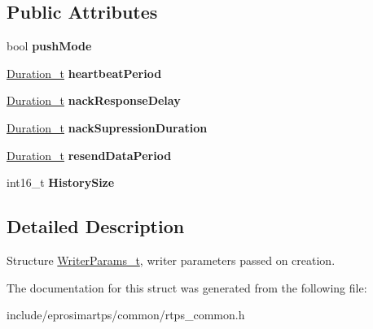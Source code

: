 \subsection*{\-Public \-Attributes}
\begin{DoxyCompactItemize}
\item 
\hypertarget{structeprosima_1_1rtps_1_1_writer_params__t_a9cdb3d394cca93c1173f714018e74c2d}{bool {\bfseries push\-Mode}}\label{structeprosima_1_1rtps_1_1_writer_params__t_a9cdb3d394cca93c1173f714018e74c2d}

\item 
\hypertarget{structeprosima_1_1rtps_1_1_writer_params__t_a00e3ebb4e40fc17294b495e2cdc68162}{\hyperlink{structeprosima_1_1rtps_1_1_time__t}{\-Duration\-\_\-t} {\bfseries heartbeat\-Period}}\label{structeprosima_1_1rtps_1_1_writer_params__t_a00e3ebb4e40fc17294b495e2cdc68162}

\item 
\hypertarget{structeprosima_1_1rtps_1_1_writer_params__t_ab50faaa0a67537459441c5bdf599dea0}{\hyperlink{structeprosima_1_1rtps_1_1_time__t}{\-Duration\-\_\-t} {\bfseries nack\-Response\-Delay}}\label{structeprosima_1_1rtps_1_1_writer_params__t_ab50faaa0a67537459441c5bdf599dea0}

\item 
\hypertarget{structeprosima_1_1rtps_1_1_writer_params__t_a57181178c6bc07de69d3d01cc625c47a}{\hyperlink{structeprosima_1_1rtps_1_1_time__t}{\-Duration\-\_\-t} {\bfseries nack\-Supression\-Duration}}\label{structeprosima_1_1rtps_1_1_writer_params__t_a57181178c6bc07de69d3d01cc625c47a}

\item 
\hypertarget{structeprosima_1_1rtps_1_1_writer_params__t_a6fd6b90cc6cbd3b0182bcfd8c8ca2fd2}{\hyperlink{structeprosima_1_1rtps_1_1_time__t}{\-Duration\-\_\-t} {\bfseries resend\-Data\-Period}}\label{structeprosima_1_1rtps_1_1_writer_params__t_a6fd6b90cc6cbd3b0182bcfd8c8ca2fd2}

\item 
\hypertarget{structeprosima_1_1rtps_1_1_writer_params__t_ad6c096bc0cfaa88ce48710676f8050f2}{int16\-\_\-t {\bfseries \-History\-Size}}\label{structeprosima_1_1rtps_1_1_writer_params__t_ad6c096bc0cfaa88ce48710676f8050f2}

\end{DoxyCompactItemize}


\subsection{\-Detailed \-Description}
\-Structure \hyperlink{structeprosima_1_1rtps_1_1_writer_params__t}{\-Writer\-Params\-\_\-t}, writer parameters passed on creation. 

\-The documentation for this struct was generated from the following file\-:\begin{DoxyCompactItemize}
\item 
include/eprosimartps/common/rtps\-\_\-common.\-h\end{DoxyCompactItemize}
